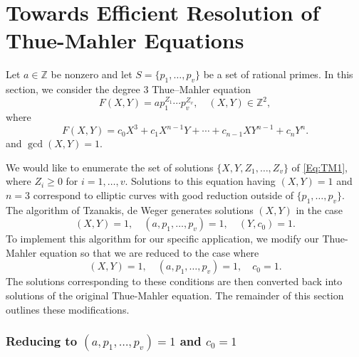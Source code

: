 
\chapter{Towards Efficient Resolution of Thue-Mahler Equations}
\label{ch:EfficientTMSolver}

Let $a \in \mathbb{Z}$ be nonzero and let $S=\{p_1,\dotsc,p_v\}$ be a set of rational primes. In this section, we consider the degree $3$ Thue--Mahler equation
\begin{equation} \label{Eq:TM1}
F(X,Y) = a p_1^{Z_1}\cdots p_v^{Z_v}, \quad (X,Y) \in \mathbb{Z}^2,
\end{equation}
where
\[F(X,Y) = c_0 X^3 + c_1 X^{n-1}Y + \cdots + c_{n-1}XY^{n-1} + c_nY^n.\]
and $\gcd(X,Y)=1$. 

We would like to enumerate the set of solutions $\{X,Y, Z_1, \dots, Z_v\}$ of \eqref{Eq:TM1}, where $Z_i \geq 0$ for $i = 1, \dots, v$. Solutions to this equation having $(X,Y) = 1$ and $n = 3$ correspond to elliptic curves with good reduction outside of $\{p_1, \dots, p_v\}$. The algorithm of Tzanakis, de Weger generates solutions $(X,Y)$ in the case 
\[(X,Y) = 1, \quad (a, p_1, \dots, p_v) = 1, \quad (Y,c_0) = 1.\]
To implement this algorithm for our specific application, we modify our Thue-Mahler equation so that we are reduced to the case where
\[(X,Y) = 1, \quad (a, p_1, \dots, p_v) = 1, \quad c_0 = 1.\]
The solutions corresponding to these conditions are then converted back into solutions of the original Thue-Mahler equation. The remainder of this section outlines these modifications. 


\subsection{Reducing to $(a, p_1, \dots, p_v) = 1$ and $c_0 = 1$}

